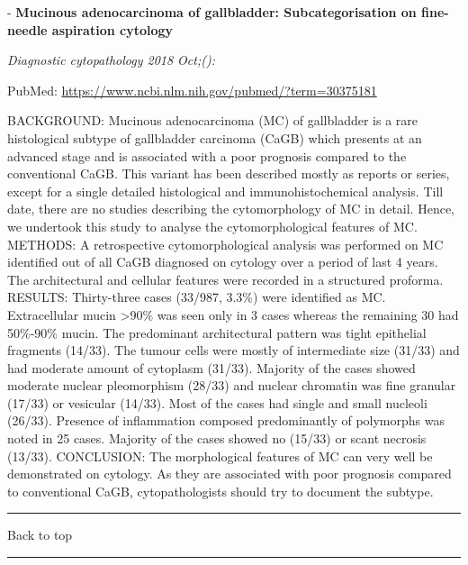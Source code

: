 \documentclass[]{article}
\begin{document}
 - \textbf{Mucinous adenocarcinoma of gallbladder: Subcategorisation on
fine-needle aspiration cytology}

\emph{Diagnostic cytopathology 2018 Oct;():}

PubMed: \url{https://www.ncbi.nlm.nih.gov/pubmed/?term=30375181}

BACKGROUND: Mucinous adenocarcinoma (MC) of gallbladder is a rare
histological subtype of gallbladder carcinoma (CaGB) which presents at
an advanced stage and is associated with a poor prognosis compared to
the conventional CaGB. This variant has been described mostly as reports
or series, except for a single detailed histological and
immunohistochemical analysis. Till date, there are no studies describing
the cytomorphology of MC in detail. Hence, we undertook this study to
analyse the cytomorphological features of MC. METHODS: A retrospective
cytomorphological analysis was performed on MC identified out of all
CaGB diagnosed on cytology over a period of last 4 years. The
architectural and cellular features were recorded in a structured
proforma. RESULTS: Thirty-three cases (33/987, 3.3\%) were identified as
MC. Extracellular mucin \textgreater{}90\% was seen only in 3 cases
whereas the remaining 30 had 50\%-90\% mucin. The predominant
architectural pattern was tight epithelial fragments (14/33). The tumour
cells were mostly of intermediate size (31/33) and had moderate amount
of cytoplasm (31/33). Majority of the cases showed moderate nuclear
pleomorphism (28/33) and nuclear chromatin was fine granular (17/33) or
vesicular (14/33). Most of the cases had single and small nucleoli
(26/33). Presence of inflammation composed predominantly of polymorphs
was noted in 25 cases. Majority of the cases showed no (15/33) or scant
necrosis (13/33). CONCLUSION: The morphological features of MC can very
well be demonstrated on cytology. As they are associated with poor
prognosis compared to conventional CaGB, cytopathologists should try to
document the subtype.

{}

{}

\begin{center}\rule{0.5\linewidth}{\linethickness}\end{center}

Back to top

\begin{center}\rule{0.5\linewidth}{\linethickness}\end{center}

\pagebreak
\end{document}
